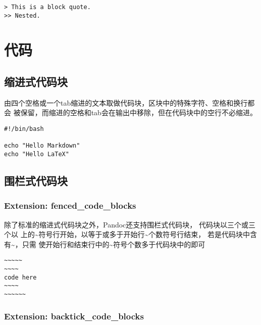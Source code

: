 \documentclass[fancyhdr,bookmark]{ctexbook}
\begin{document}
\begin{lstlisting}
> This is a block quote.
>> Nested.
\end{lstlisting}

\hypertarget{ux4ee3ux7801}{%
\section{代码}\label{ux4ee3ux7801}}

\hypertarget{ux7f29ux8fdbux5f0fux4ee3ux7801ux5757}{%
\subsection{缩进式代码块}\label{ux7f29ux8fdbux5f0fux4ee3ux7801ux5757}}

由四个空格或一个tab缩进的文本取做代码块，区块中的特殊字符、空格和换行都会
被保留，而缩进的空格和tab会在输出中移除，但在代码块中的空行不必缩进。

\begin{lstlisting}
#!/bin/bash

echo "Hello Markdown"
echo "Hello LaTeX"
\end{lstlisting}

\hypertarget{ux56f4ux680fux5f0fux4ee3ux7801ux5757}{%
\subsection{围栏式代码块}\label{ux56f4ux680fux5f0fux4ee3ux7801ux5757}}

\hypertarget{extension-fenced_code_blocks}{%
\subsubsection{Extension:
fenced\_code\_blocks}\label{extension-fenced_code_blocks}}

除了标准的缩进式代码块之外，Pandoc还支持围栏式代码块，
代码块以三个或三个以
上的\textasciitilde 符号行开始，以等于或多于开始行\textasciitilde 个数符号行结束，
若是代码块中含有\textasciitilde，只需
使开始行和结束行中的\textasciitilde 符号个数多于代码块中的即可

\begin{lstlisting}
~~~~~
~~~~
code here
~~~~
~~~~~~
\end{lstlisting}

\hypertarget{extension-backtick_code_blocks}{%
\subsubsection{Extension:
backtick\_code\_blocks}\label{extension-backtick_code_blocks}}
\end{document}
